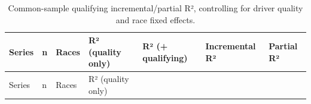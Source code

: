 \documentclass[
  10pt]{article}
\begin{document}
\begin{longtable}[]{@{}
  >{\raggedright\arraybackslash}p{}
  >{\raggedleft\arraybackslash}p{}
  >{\raggedleft\arraybackslash}p{}
  >{\raggedleft\arraybackslash}p{}
  >{\raggedleft\arraybackslash}p{}
  >{\raggedleft\arraybackslash}p{}
  >{\raggedleft\arraybackslash}p{}@{}}
\caption{Common-sample qualifying incremental/partial R², controlling
for driver quality and race fixed
effects.}\label{tbl-common-sample}\tabularnewline
\toprule\noalign{}
\begin{minipage}[b]{\linewidth}\raggedright
Series
\end{minipage} & \begin{minipage}[b]{\linewidth}\raggedleft
n
\end{minipage} & \begin{minipage}[b]{\linewidth}\raggedleft
Races
\end{minipage} & \begin{minipage}[b]{\linewidth}\raggedleft
R² (quality only)
\end{minipage} & \begin{minipage}[b]{\linewidth}\raggedleft
R² (+ qualifying)
\end{minipage} & \begin{minipage}[b]{\linewidth}\raggedleft
Incremental R²
\end{minipage} & \begin{minipage}[b]{\linewidth}\raggedleft
Partial R²
\end{minipage} \\
\midrule\noalign{}
\endfirsthead
\toprule\noalign{}
\begin{minipage}[b]{\linewidth}\raggedright
Series
\end{minipage} & \begin{minipage}[b]{\linewidth}\raggedleft
n
\end{minipage} & \begin{minipage}[b]{\linewidth}\raggedleft
Races
\end{minipage} & \begin{minipage}[b]{\linewidth}\raggedleft
R² (quality only)
\end{minipage} & \begin{minipage}[b]{\linewidth}\raggedleft

\end{minipage}
\end{longtable}
\end{document}
